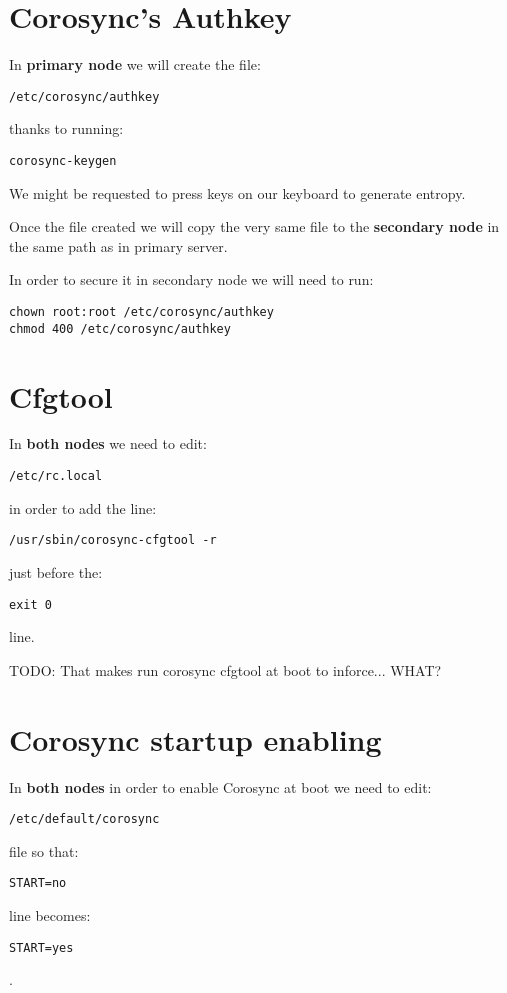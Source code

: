 \section {Corosync's Authkey}
In \textbf{primary node} we will create the file:
\begin{verbatim}
/etc/corosync/authkey
\end{verbatim}
thanks to running:
\begin{verbatim}
corosync-keygen
\end{verbatim}
We might be requested to press keys on our keyboard to generate entropy.

Once the file created we will copy the very same file to the \textbf{secondary node} in the same path as in primary server.

In order to secure it in secondary node we will need to run:
\begin{verbatim}
chown root:root /etc/corosync/authkey
chmod 400 /etc/corosync/authkey
\end{verbatim}

\section {Cfgtool}

In \textbf{both nodes} we need to edit:
\begin{verbatim}
/etc/rc.local
\end{verbatim}
in order to add the line:
\begin{verbatim}
/usr/sbin/corosync-cfgtool -r
\end{verbatim}
just before the:
\begin{verbatim}
exit 0
\end{verbatim}
line.

TODO: That makes run corosync cfgtool at boot to inforce... WHAT?

\section {Corosync startup enabling}
In \textbf{both nodes} in order to enable Corosync at boot we need to edit:
\begin{verbatim}
/etc/default/corosync
\end{verbatim}
file so that:
\begin{verbatim}
START=no
\end{verbatim}
line becomes:
\begin{verbatim}
START=yes
\end{verbatim}
.

